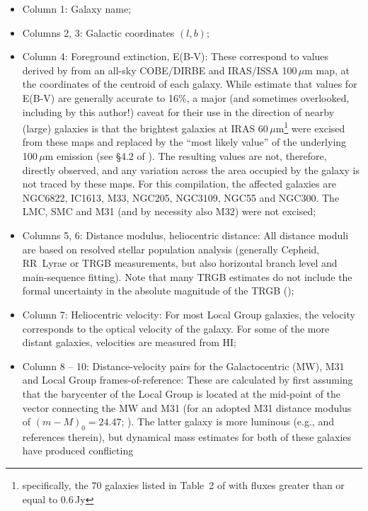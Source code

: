 \documentclass[manuscript]{aastex}
\begin{document}
\begin{itemize}
\item Column 1: Galaxy name;
\item Columns 2, 3: Galactic coordinates $(l, b)$;
\item Column 4: Foreground extinction, E(B-V): These correspond to
  values derived by \cite{schlegel1998} from an all-sky COBE/DIRBE and
  IRAS/ISSA 100\,$\mu$m map, at the coordinates of the centroid of
  each galaxy. While \cite{schlegel1998} estimate that values for
  E(B-V) are generally accurate to 16\%, a major (and sometimes
  overlooked, including by this author!) caveat for their use in the
  direction of nearby (large) galaxies is that the brightest galaxies
  at IRAS 60\,$\mu$m\footnote{specifically, the 70 galaxies listed in
    Table~2 of \cite{rice1988} with fluxes greater than or equal to
    0.6\,Jy} were excised from these maps and replaced by the ``most
  likely value'' of the underlying 100\,$\mu$m emission (see \S4.2 of
  \citealt{schlegel1998}). The resulting values are not, therefore,
  directly observed, and any variation across the area occupied by the
  galaxy is not traced by these maps. For this compilation, the
  affected galaxies are NGC6822, IC1613, M33, NGC205, NGC3109, NGC55
  and NGC300. The LMC, SMC and M31 (and by necessity also M32) were
  not excised;
\item Columns 5, 6: Distance modulus, heliocentric distance: All
  distance moduli are based on resolved stellar population analysis
  (generally Cepheid, RR~Lyrae or TRGB
  measurements, but also horizontal branch level and main-sequence
  fitting). Note that many TRGB estimates do not include the
  formal uncertainty in the absolute magnitude of the TRGB (\citealt{bellazzini2001,
    bellazzini2004a, rizzi2007});
\item Column 7: Heliocentric velocity: For most Local Group galaxies,
  the velocity corresponds to the optical velocity of the galaxy. For
  some of the more distant galaxies, velocities are measured from HI;
\item Column 8 -- 10: Distance-velocity pairs for the Galactocentric
  (MW), M31 and Local Group frames-of-reference: These are calculated
  by first assuming that the barycenter of the Local Group is located
  at the mid-point of the vector connecting the MW and M31 (for an
  adopted M31 distance modulus of $(m-M)_0 = 24.47$;
  \citealt{mcconnachie2005a}). The latter galaxy is more luminous
  (e.g., \citealt{hammer2007} and references therein), but dynamical
  mass estimates for both of these galaxies have produced conflicting

\end{itemize}
\end{document}
